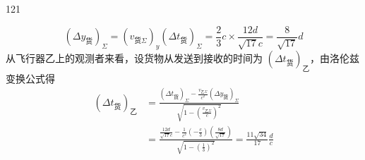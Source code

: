\begin{solution}{121}
\begin{subsolution}
\begin{equation}
            (\Delta y_{\text{货}})_{\Sigma} = (v_{\text{货}\Sigma})_{y} (\Delta t_{\text{货}})_{\Sigma} = \frac{2}{3} c \times \frac{12 d}{\sqrt{17} c} = \frac{8}{\sqrt{17}} d
            \label{eq:14.s121}
        \end{equation}
        从飞行器乙上的观测者来看，设货物从发送到接收的时间为 $(\Delta t_{\text{货}})_{\text{乙}}$，由洛伦兹变换公式得
        \begin{align}
            (\Delta t_{\text{货}})_{\text{乙}} & = \frac{(\Delta t_{\text{货}})_{\Sigma} - \frac{v_{\text{乙}\Sigma}}{c^{2}} (\Delta y_{\text{货}})_{\Sigma}}{\sqrt{1 - (\frac{v_{\text{乙}\Sigma}}{c})^{2}}} \nonumber \\
            & = \frac{\frac{12 d}{\sqrt{17} c} - \frac{1}{c^{2}} (-\frac{c}{3}) (\frac{8 d}{\sqrt{17}})}{\sqrt{1 - (\frac{1}{3})^{2}}} = \frac{11 \sqrt{34}}{17} \frac{d}{c}
            \label{eq:15.s121}
        \end{align}
    \end{subsolution}
\end{solution}